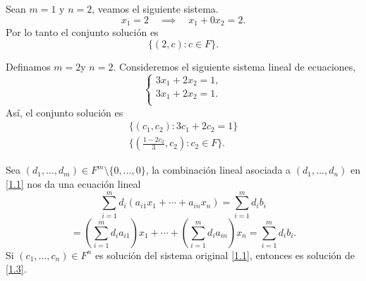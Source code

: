 \documentclass[12pt,a4paper]{book}
\newcommand{\llaves}[1]{\{#1\}}
\newcommand{\parentesis}[1]{\left(#1\right)}
\newcommand{\llavesgrande}[1]{\big\{#1\big\}}
\begin{document}
    \begin{ejemplo}
        Sean $m = 1$ y $n = 2$, veamos el siguiente sistema.
        \begin{equation*}
            x_1 = 2 \quad \implies \quad x_1 + 0x_2 = 2.
        \end{equation*}
        Por lo tanto el conjunto solución es
        \begin{equation*}
            \llaves{(2,c):c\in F}.
        \end{equation*}
    \end{ejemplo}

    \vspace{1.4cm}

    \begin{ejemplo}
        Definamos $m = 2$y $n = 2$. Consideremos el siguiente sistema lineal de ecuaciones,
        \begin{equation*}
            \begin{cases}
                3x_1+2x_2 = 1,\\
                3x_1+2x_2 = 1.\\
            \end{cases}
        \end{equation*}
        Así, el conjunto solución es
        \begin{align*}
            \llavesgrande{(c_1, c_2): 3c_1 + 2c_2 = 1}\\
            \llavesgrande{\parentesis{\tfrac{1 - 2c_2}{3}, c_2}:c_2 \in F}.
        \end{align*}
    \end{ejemplo}

    Sea $\parentesis{d_1, \dots , d_m} \in F^m \setminus\llaves{0, \dots , 0}$, la combinación lineal asociada a $\parentesis{d_1, \dots , d_n}$ en \eqref{1.1} nos da una ecuación lineal
    \begin{equation*}
        \sum_{i = 1}^md_i \parentesis{a_{i1}x_1 + \dotsi + a_{in}x_n} = \sum_{i = 1}^md_ib_i
    \end{equation*}
    \begin{equation*}
        = \parentesis{\sum_{i = 1}^md_ia_{i1}} x_1 + \dotsi + \parentesis{\sum_{i = 1}^md_ia_{in}}x_n = \sum_{i = 1}^md_ib_i.
        \tag{1.3}
        \label{1.3}
    \end{equation*}
    Si $\parentesis{c_1, \dots, c_n} \in F^n$ es solución del sistema original \eqref{1.1}, entonces es solución de \eqref{1.3}.
    
\end{document}
